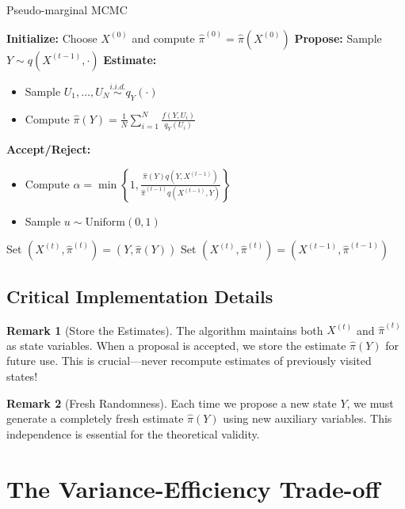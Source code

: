 \documentclass[11pt]{article}
\theoremstyle{definition}
\newtheorem{remark}{Remark}
\begin{document}
\begin{algorithm}
\caption{Pseudo-marginal MCMC}
\begin{algorithmic}[1]
\STATE \textbf{Initialize:} Choose $X^{(0)}$ and compute $\hat{\pi}^{(0)} = \hat{\pi}(X^{(0)})$
    \STATE \textbf{Propose:} Sample $Y \sim q(X^{(t-1)}, \cdot)$
    \STATE \textbf{Estimate:} 
    \begin{itemize}
        \item Sample $U_1, \ldots, U_N \stackrel{i.i.d.}{\sim} q_Y(\cdot)$
        \item Compute $\hat{\pi}(Y) = \frac{1}{N}\sum_{i=1}^{N} \frac{f(Y,U_i)}{q_Y(U_i)}$
    \end{itemize}
    \STATE \textbf{Accept/Reject:} 
    \begin{itemize}
        \item Compute $\alpha = \min\left\{1, \frac{\hat{\pi}(Y)q(Y,X^{(t-1)})}{\hat{\pi}^{(t-1)}q(X^{(t-1)},Y)}\right\}$
        \item Sample $u \sim \text{Uniform}(0,1)$
    \end{itemize}
        \STATE Set $(X^{(t)}, \hat{\pi}^{(t)}) = (Y, \hat{\pi}(Y))$
    \ELSE
        \STATE Set $(X^{(t)}, \hat{\pi}^{(t)}) = (X^{(t-1)}, \hat{\pi}^{(t-1)})$
    \ENDIF
\ENDFOR
\end{algorithmic}
\end{algorithm}

\subsection{Critical Implementation Details}

\begin{remark}[Store the Estimates]
The algorithm maintains both $X^{(t)}$ and $\hat{\pi}^{(t)}$ as state variables. When a proposal is accepted, we store the estimate $\hat{\pi}(Y)$ for future use. This is crucial---never recompute estimates of previously visited states!
\end{remark}

\begin{remark}[Fresh Randomness]
Each time we propose a new state $Y$, we must generate a completely fresh estimate $\hat{\pi}(Y)$ using new auxiliary variables. This independence is essential for the theoretical validity.
\end{remark}

\section{The Variance-Efficiency Trade-off}
\end{document}
